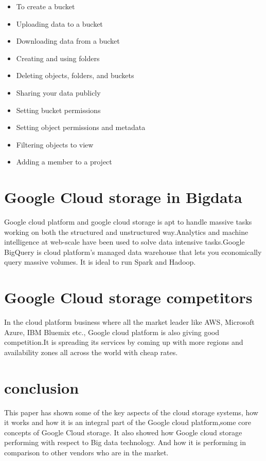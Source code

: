 \documentclass[9pt,twocolumn,twoside]{styles/osajnl}
\begin{document}
\begin{itemize}


\item To create a bucket
\item Uploading data to a bucket
\item Downloading data from a bucket
\item Creating and using folders
\item Deleting objects, folders, and buckets
\item Sharing your data publicly
\item Setting bucket permissions
\item Setting object permissions and metadata
\item Filtering objects to view
\item Adding a member to a project

\end{itemize} 

\section{Google Cloud storage in Bigdata}

Google cloud platform and google cloud storage is apt to handle massive tasks working on both the structured and unstructured way.Analytics and machine intelligence at web-scale have been used to solve data intensive tasks.Google BigQuery \cite{www-google-bigquery} is cloud platform's  managed data warehouse that lets you economically query massive volumes. It is ideal to run Spark and Hadoop.

\section{Google Cloud storage competitors}
In the cloud platform business where all the market leader like AWS, Microsoft Azure, IBM Bluemix etc., Google cloud platform is also giving good competition.It is spreading its services by coming up with more regions and availability zones all across the world with cheap rates. 

\section{conclusion}
This paper has shown some of the key aspects of the cloud storage systems, how it works and how it is an integral part of the Google cloud platform,some core concepts of Google Cloud storage. It also showed how Google cloud storage performing with respect to Big data technology. And how it is performing in comparison to other vendors who are in the market.


\end{document}
